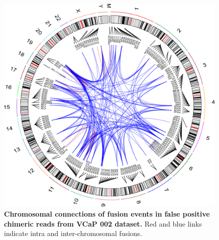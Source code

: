 \documentclass[pdflatex, sn-mathphys-num, lineno]{sn-jnl}%
\theoremstyle{thmstyleone}%
\theoremstyle{thmstyletwo}%
\theoremstyle{thmstylethree}%
\begin{document}
\begin{figure}[!h]
	\includegraphics[height=0.97\columnwidth]{finals/sf3}
	\caption{ {\bf Chromosomal connections of fusion events in false positive chimeric reads from VCaP 002 dataset.} Red and blue links indicate intra and inter-chromosomal fusions.}
	\label{fig:sf3}
\end{figure}
\end{document}
